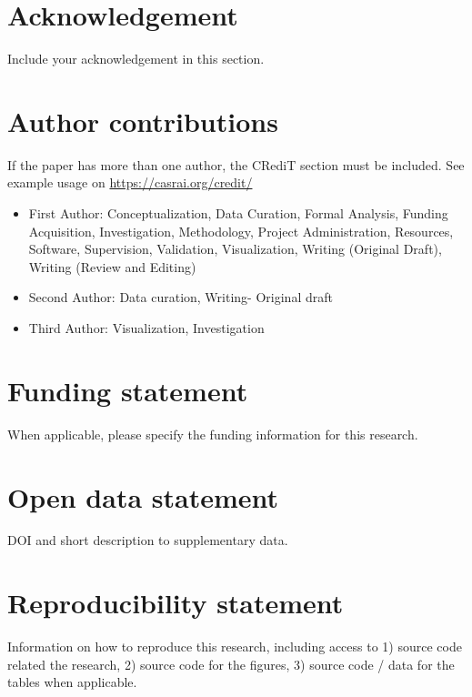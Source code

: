 \documentclass[
  manuscript=proceedings,  %
  layout=preprint,  %
  year=20xx,
  volume=x,
]{extra/joas}
\begin{document}
\section*{Acknowledgement}
Include your acknowledgement in this section.

\section*{Author contributions}
  If the paper has more than one author, the CRediT section must be included. See example usage on \url{https://casrai.org/credit/}

  \begin{itemize}
    \item First Author: Conceptualization, Data Curation, Formal Analysis, Funding Acquisition, Investigation, Methodology, Project Administration, Resources, Software, Supervision, Validation, Visualization, Writing (Original Draft), Writing (Review and Editing)
    \item Second Author: Data curation, Writing- Original draft
    \item Third Author: Visualization, Investigation
  \end{itemize}


\section*{Funding statement}
When applicable, please specify the funding information for this research.


\section*{Open data statement}
DOI and short description to supplementary data.

\section*{Reproducibility statement}
Information on how to reproduce this research, including access to 1) source code related the research, 2) source code for the figures, 3) source code / data for the tables when applicable.



\printbibliography
\end{document}
